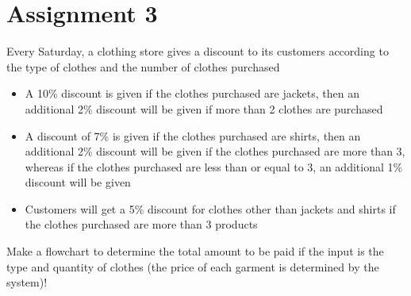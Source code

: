 \documentclass[12pt,titlepage]{article}
\begin{document}
\begin{center}
\end{center}

\pagebreak

\section{Assignment 3}
Every Saturday, a clothing store gives a discount to its customers according to the
type of clothes and the number of clothes purchased
\begin{itemize}
    \item {
        A 10\% discount is given if the clothes purchased are jackets, then an additional
        2\% discount will be given if more than 2 clothes are purchased
    }
    \item {
        A discount of 7\% is given if the clothes purchased are shirts, then an additional
        2\% discount will be given if the clothes purchased are more than 3, whereas if
        the clothes purchased are less than or equal to 3, an additional 1\% discount will
        be given
    }
    \item {
        Customers will get a 5\% discount for clothes other than jackets and shirts if the
        clothes purchased are more than 3 products
    }
\end{itemize}
Make a flowchart to determine the total amount to be paid if the input is the type
and quantity of clothes (the price of each garment is determined by the system)!
\end{document}
